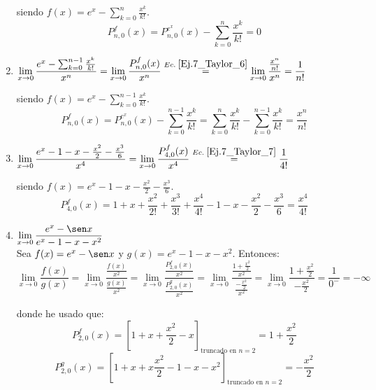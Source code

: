\begin{ejercicio}
\begin{enumerate}
        siendo $f(x) = e^x - \sum_{k=0}^n \frac{x^k}{k!}$.
        \begin{equation} \label{Ej.7_Taylor_5}
            P_{n,0}^f(x) = P_{n,0}^{e^x}(x) - \sum_{k=0}^n \frac{x^k}{k!} = 0
        \end{equation}

        \item $\displaystyle \lim_{x\to 0} \frac{e^x - \sum_{k=0}^{n-1} \frac{x^k}{k!}}{x^n} = \lim_{x\to 0} \frac{P_{n,0}^f(x)}{x^n} \stackrel{Ec.\;\ref{Ej.7_Taylor_6}}{=} \lim_{x\to 0} \frac{\frac{x^n}{n!}}{x^n} = \frac{1}{n!}$
        
        siendo $f(x) = e^x - \sum_{k=0}^{n-1} \frac{x^k}{k!}$.
        \begin{equation} \label{Ej.7_Taylor_6}
            P_{n,0}^f(x) = P_{n,0}^{e^x}(x) - \sum_{k=0}^{n-1} \frac{x^k}{k!} = \sum_{k=0}^{n} \frac{x^k}{k!} - \sum_{k=0}^{n-1} \frac{x^k}{k!} = \frac{x^n}{n!}
        \end{equation}

        \item $\displaystyle \lim_{x\to 0} \frac{e^x-1-x-\frac{x^2}{2}-\frac{x^3}{6}}{x^4} = \lim_{x\to 0} \frac{P_{4,0}^f(x)}{x^4} \stackrel{Ec.\;\ref{Ej.7_Taylor_7}}{=} \frac{1}{4!}$
        
        siendo $f(x) = e^x-1-x-\frac{x^2}{2}-\frac{x^3}{6}$.
        \begin{equation}\label{Ej.7_Taylor_7}
            P_{4,0}^{f}(x) = 1 + x + \frac{x^2}{2!} + \frac{x^3}{3!} + \frac{x^4}{4!} -1 - x - \frac{x^2}{2} - \frac{x^3}{6} = \frac{x^4}{4!}
        \end{equation}

        \item $\displaystyle \lim_{x\to 0} \frac{e^x- \sen x}{e^x - 1 -x-x^2}$\\
        
        Sea $f(x) = e^x- \sen x$ y $g(x) = e^x - 1 -x-x^2$. Entonces:
        \begin{equation*}
            \lim_{x\to 0} \frac{f(x)}{g(x)} = \lim_{x\to 0} \frac{\frac{f(x)}{x^2}}{\frac{g(x)}{x^2}}
            = \lim_{x\to 0} \frac{\frac{P_{2, 0}^f(x)}{x^2}}{\frac{P_{2, 0}^g(x)}{x^2}}
            = \lim_{x\to 0} \frac{\frac{1+\frac{x^2}{2}}{x^2}}{\frac{-\frac{x^2}{2}}{x^2}}
            = \lim_{x\to 0} \frac{1+\frac{x^2}{2}}{-\frac{x^2}{2}} = \frac{1}{0^-} = -\infty
        \end{equation*}

        donde he usado que:
        \begin{equation*}
            P_{2, 0}^f(x) = \left[1+x+\frac{x^2}{2} - x \right]_{\text{truncado en } n=2} = 1+\frac{x^2}{2}
        \end{equation*}
        \begin{equation*}
            P_{2, 0}^g(x) = \left[1+x+x\frac{x^2}{2} - 1 - x - x^2 \right]_{\text{truncado en } n=2} = -\frac{x^2}{2}
        \end{equation*}
        
    \end{enumerate}
\end{ejercicio}

